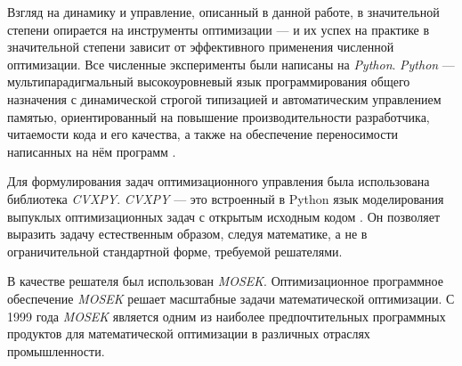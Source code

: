 \begin{comment}
		{Q}_1{N}_1\T \\0
	\end{bmatrix}\T \\ \leq  \frac{1}{\epsilon_3}\begin{bmatrix}
		{Q}_1{N}_1\T \\0
	\end{bmatrix}\begin{bmatrix}
		{Q}_1{N}_1\T \\ 0
	\end{bmatrix}\T +\epsilon_3 \begin{bmatrix}
		0 \\ {P}_2{S}{M}_1
	\end{bmatrix}\begin{bmatrix}
		0 \\ {P}_2{S}{M}_1
	\end{bmatrix}\T.
\end{multline}
%
Подставляя \eqref{eq:thm1_term_1},\eqref{eq:thm1_term_2} и \eqref{eq:thm1_term_3} в \eqref{eq:Young_expand} получаем выражение \eqref{eq:thm1_LMI_after_Young}.

\clearpage
\refstepcounter{chapter}

\end{comment}
Взгляд на динамику и управление, описанный в данной работе, в значительной степени опирается на инструменты оптимизации --- и их успех на практике в значительной степени зависит от эффективного применения численной оптимизации.
Все численные эксперименты были написаны на \textit{Python}.
\textit{Python} --- мультипарадигмальный высокоуровневый язык программирования общего назначения с динамической строгой типизацией и автоматическим управлением памятью, ориентированный на повышение производительности разработчика, читаемости кода и его качества, а также на обеспечение переносимости написанных на нём программ \cite{python}.

Для формулирования задач оптимизационного управления была использована библиотека \textit{CVXPY}.
\textit{CVXPY} --- это встроенный в Python язык моделирования выпуклых оптимизационных задач с открытым исходным кодом \cite{cvxpy}. Он позволяет выразить задачу естественным образом, следуя математике, а не в ограничительной стандартной форме, требуемой решателями.

В качестве решателя был использован \textit{MOSEK}.
Оптимизационное программное обеспечение \textit{MOSEK} \cite{mosek} решает масштабные задачи математической оптимизации. С 1999 года \textit{MOSEK} является одним из наиболее предпочтительных программных продуктов для математической оптимизации в различных отраслях промышленности. 

